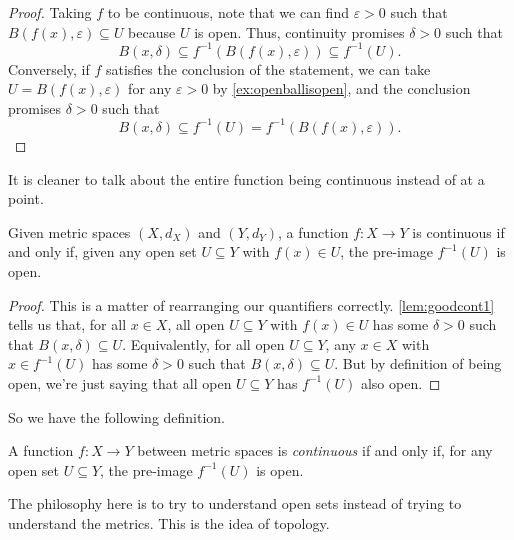 \documentclass[../notes.tex]{subfiles}
\begin{document}
\begin{proof}
	Taking $f$ to be continuous, note that we can find $\varepsilon>0$ such that $B(f(x),\varepsilon)\subseteq U$ because $U$ is open. Thus, continuity promises $\delta>0$ such that
	\[B(x,\delta)\subseteq f^{-1}(B(f(x),\varepsilon))\subseteq f^{-1}(U).\]
	Conversely, if $f$ satisfies the conclusion of the statement, we can take $U=B(f(x),\varepsilon)$ for any $\varepsilon>0$ by \autoref{ex:openballisopen}, and the conclusion promises $\delta>0$ such that
	\[B(x,\delta)\subseteq f^{-1}(U)=f^{-1}(B(f(x),\varepsilon)).\]
\end{proof}
It is cleaner to talk about the entire function being continuous instead of at a point.
\begin{lemma}
	Given metric spaces $(X,d_X)$ and $(Y,d_Y)$, a function $f\colon X\to Y$ is continuous if and only if, given any open set $U\subseteq Y$ with $f(x)\in U$, the pre-image $f^{-1}(U)$ is open.
\end{lemma}
\begin{proof}
	This is a matter of rearranging our quantifiers correctly. \autoref{lem:goodcont1} tells us that, for all $x\in X$, all open $U\subseteq Y$ with $f(x)\in U$ has some $\delta>0$ such that $B(x,\delta)\subseteq U$. Equivalently, for all open $U\subseteq Y$, any $x\in X$ with $x\in f^{-1}(U)$ has some $\delta>0$ such that $B(x,\delta)\subseteq U$. But by definition of being open, we're just saying that all open $U\subseteq Y$ has $f^{-1}(U)$ also open.
\end{proof}
So we have the following definition.
\begin{definition}[Continuous]
	A function $f\colon X\to Y$ between metric spaces is \textit{continuous} if and only if, for any open set $U\subseteq Y$, the pre-image $f^{-1}(U)$ is open.
\end{definition}
The philosophy here is to try to understand open sets instead of trying to understand the metrics. This is the idea of topology.
\end{document}
